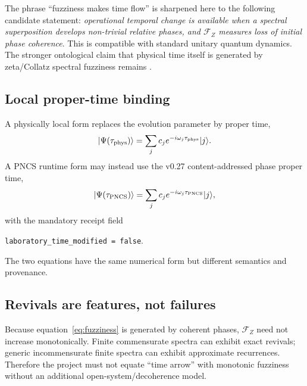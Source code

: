\INTERP
The phrase ``fuzziness makes time flow'' is sharpened here to the following candidate statement: \emph{operational temporal change is available when a spectral superposition develops non-trivial relative phases, and \(\mathcal F_Z\) measures loss of initial phase coherence}. This is compatible with standard unitary quantum dynamics. The stronger ontological claim that physical time itself is generated by zeta/Collatz spectral fuzziness remains .

\subsection{Local proper-time binding}

A physically local form replaces the evolution parameter by proper time,
\begin{equation}
|\Psi(\tau_{\rm phys})\rangle
=\sum_jc_j e^{-i\omega_j\tau_{\rm phys}}|j\rangle.
\end{equation}
A PNCS runtime form may instead use the v0.27 content-addressed phase proper time,
\begin{equation}
|\Psi(\tau_{\rm PNCS})\rangle
=\sum_jc_j e^{-i\omega_j\tau_{\rm PNCS}}|j\rangle,
\end{equation}
with the mandatory receipt field
\begin{center}
\texttt{laboratory\_time\_modified = false}.
\end{center}
The two equations have the same numerical form but different semantics and provenance.

\subsection{Revivals are features, not failures}

Because equation~\eqref{eq:fuzziness} is generated by coherent phases, \(\mathcal F_Z\) need not increase monotonically. Finite commensurate spectra can exhibit exact revivals; generic incommensurate finite spectra can exhibit approximate recurrences. Therefore the project must not equate ``time arrow'' with monotonic fuzziness without an additional open-system/decoherence model.
